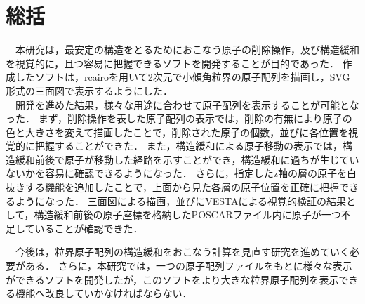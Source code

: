 \section{総括}
　本研究は，最安定の構造をとるためにおこなう原子の削除操作，及び構造緩和を視覚的に，且つ容易に把握できるソフトを開発することが目的であった．
作成したソフトは，rcairoを用いて2次元で小傾角粒界の原子配列を描画し，SVG形式の三面図で表示するようにした．\\
　開発を進めた結果，様々な用途に合わせて原子配列を表示することが可能となった．
まず，削除操作を表した原子配列の表示では，削除の有無により原子の色と大きさを変えて描画したことで，削除された原子の個数，並びに各位置を視覚的に把握することができた．
また，構造緩和による原子移動の表示では，構造緩和前後で原子が移動した経路を示すことができ，構造緩和に過ちが生じていないかを容易に確認できるようになった．
さらに，指定したz軸の層の原子を白抜きする機能を追加したことで，上面から見た各層の原子位置を正確に把握できるようになった．
三面図による描画，並びにVESTAによる視覚的検証の結果として，構造緩和前後の原子座標を格納したPOSCARファイル内に原子が一つ不足していることが確認できた．

　今後は，粒界原子配列の構造緩和をおこなう計算を見直す研究を進めていく必要がある．
さらに，本研究では，一つの原子配列ファイルをもとに様々な表示ができるソフトを開発したが，このソフトをより大きな粒界原子配列を表示できる機能へ改良していかなければならない．

